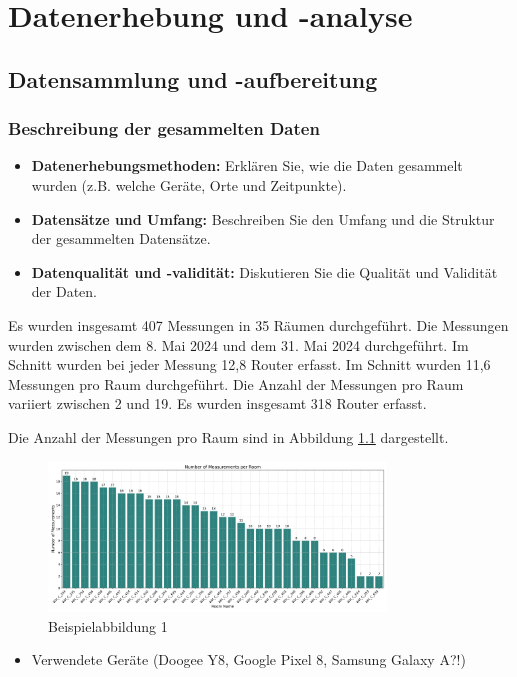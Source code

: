 \chapter{Datenerhebung und -analyse}
\section{Datensammlung und -aufbereitung}
\subsection{Beschreibung der gesammelten Daten}

\begin{itemize}
    \item \textbf{Datenerhebungsmethoden:} Erklären Sie, wie die Daten gesammelt wurden (z.B. welche Geräte, Orte und Zeitpunkte).
    \item \textbf{Datensätze und Umfang:} Beschreiben Sie den Umfang und die Struktur der gesammelten Datensätze.
    \item \textbf{Datenqualität und -validität:} Diskutieren Sie die Qualität und Validität der Daten.
\end{itemize}

Es wurden insgesamt 407 Messungen in 35 Räumen durchgeführt. Die Messungen wurden zwischen dem 8. Mai 2024 und dem 31. Mai 2024 durchgeführt. Im Schnitt wurden bei jeder Messung 12,8 Router erfasst. Im Schnitt wurden 11,6 Messungen pro Raum durchgeführt. Die Anzahl der Messungen pro Raum variiert zwischen 2 und 19. Es wurden insgesamt 318 Router erfasst.

Die Anzahl der Messungen pro Raum sind in Abbildung \ref{fig:0_general_01} dargestellt.

\begin{figure}[H]
    \centering
    \includegraphics[width=0.8\textwidth]{images/0_general_01.png}
    \caption{Beispielabbildung 1}
    \label{fig:0_general_01}
\end{figure}

\begin{itemize}
    \item Verwendete Geräte (Doogee Y8, Google Pixel 8, Samsung Galaxy A?!)
\end{itemize}

